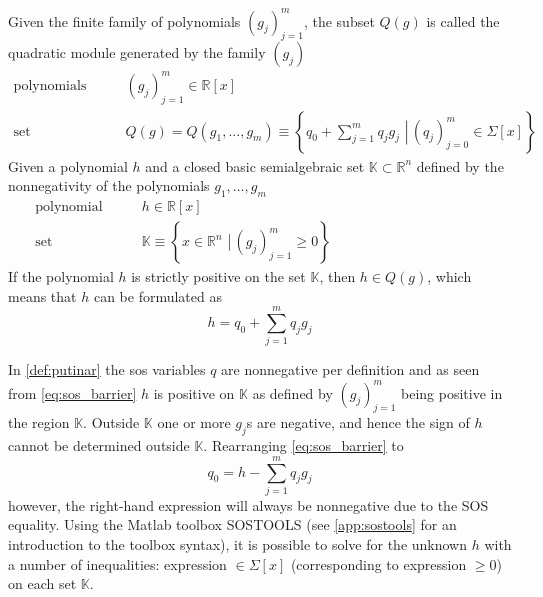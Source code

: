  

\begin{thm}\label{def:putinar}
Given the finite family of polynomials $(g_j)_{j=1}^m$, the subset $Q(g)$ is called the quadratic module generated by the family $(g_j)$ \citep[p 29]{bib:sos_putinar_lasserre}
\begin{subequations}\label{eq:putinar}
\begin{align}
\text{polynomials} \qquad & (g_j)_{j=1}^m \in\mathbb{R}[x]\\
\text{set} \qquad & Q(g)=Q(g_1,...,g_m)\equiv\left\{\left.q_0+\sum\limits_{j=1}^{m}q_jg_j\,\,\right| \, (q_j)_{j=0}^m\in\Sigma[x]\right\}
\end{align}
\end{subequations}
Given a polynomial $h$ and a closed basic semialgebraic set $\mathbb{K}\subset\mathbb{R}^n$ defined by the nonnegativity of the polynomials $g_1,\dots, g_m$  
\begin{subequations}
\begin{align}
\text{polynomial} \qquad & h \in\mathbb{R}[x]\\
\text{set} \qquad & \mathbb{K}\equiv\left\{\left.x\in \mathbb{R}^n\,\, \right| \, (g_j)_{j=1}^m\geq0\right\}\qquad\qquad\qquad\qquad\qquad\quad
\end{align}
\end{subequations}
If the polynomial $h$ is strictly positive on the set $\mathbb{K}$, then $h\in Q(g)$, which means that $h$  can be formulated as
\begin{equation}\label{eq:sos_barrier}
h = q_0+\sum\limits_{j=1}^{m}q_jg_j
\end{equation}
\end{thm}





In \autoref{def:putinar} the \gls{sos} variables $q$ are nonnegative per definition and as seen from \autoref{eq:sos_barrier} $h$ is positive on $\mathbb{K}$ as defined by $(g_j)_{j=1}^m$ being positive  in the region $\mathbb{K}$. Outside $\mathbb{K}$ one or more $g_j$s are negative, and hence the sign of $h$ cannot be determined outside $\mathbb{K}$.
Rearranging \autoref{eq:sos_barrier} to
\begin{equation}
q_0 = h - \sum _{j=1}^{m}q_jg_j \label{eq:putinar_sos}
\end{equation} 
however, the right-hand expression will always be nonnegative due to the SOS equality. Using the Matlab toolbox SOSTOOLS (see \autoref{app:sostools} for an introduction to the toolbox syntax), it is possible to solve for the unknown $h$ with a number of inequalities: expression $\in\Sigma[x]$ (corresponding to expression $\geq 0$) on each set $\mathbb{K}$. 

